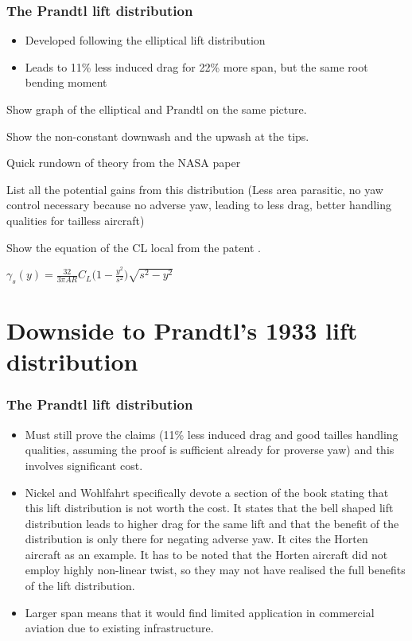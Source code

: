 \documentclass{beamer}
\begin{document}
\begin{frame}
\frametitle{The Prandtl lift distribution}
\begin{itemize}
\item Developed following the elliptical lift distribution
\item Leads to 11\% less induced drag for 22\% more span, but the same root bending moment
\end{itemize}


Show graph of the elliptical and Prandtl on the same picture.

Show the non-constant downwash and the upwash at the tips.

Quick rundown of theory from the NASA paper


List all the potential gains from this distribution (Less area parasitic, no yaw control necessary because no adverse yaw, leading to less drag, better handling qualities for tailless aircraft)

Show the equation of the CL local from the patent \cite{PrandtlPatent}.

$\gamma_s(y) = \frac{32}{3 \pi AR} C_L \bigg( 1 - \frac{y^2}{s^2} \bigg) \sqrt{s^2 - y^2}$

\end{frame}


\section{Downside to Prandtl's 1933 lift distribution}

\begin{frame}
\frametitle{The Prandtl lift distribution}
\begin{itemize}
\item Must still prove the claims (11\% less induced drag and good tailles handling qualities, assuming the proof is sufficient already for proverse yaw) and this involves significant cost.
\item Nickel and Wohlfahrt \cite{NickelWohlfahrt} specifically devote a section of the book stating that this lift distribution is not worth the cost.  It states that the bell shaped lift distribution leads to higher drag for the same lift and that the benefit of the distribution is only there for negating adverse yaw.  It cites the Horten aircraft as an example.  It has to be noted that the Horten aircraft did not employ highly non-linear twist, so they may not have realised the full benefits of the lift distribution.
\item Larger span means that it would find limited application in commercial aviation due to existing infrastructure.
\end{itemize}
\end{frame}
\end{document}
